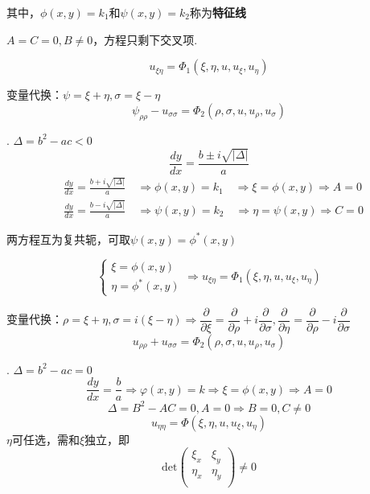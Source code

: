 其中，$\phi(x,y)=k_{1}$和$\psi(x,y)=k_{2}$称为\textbf{特征线}

$A=C=0,B\ne0$，方程只剩下交叉项.
\begin{dfn}[双曲型PDE的标准形式]
$$u_{\xi\eta}=\Phi_{1}(\xi,\eta,u,u_{\xi},u_{\eta})$$

变量代换：$\psi=\xi+\eta,\sigma=\xi-\eta$
$$\psi_{\rho\rho}-u_{\sigma\sigma}=\Phi_{2}(\rho,\sigma,u,u_{\rho},u_{\sigma})$$
\end{dfn}


. $\Delta=b^2-ac<0$
$$\frac{dy}{dx}=\frac{b\pm i\sqrt{|\Delta|}}{a}$$
$$\begin{aligned}
    &\frac{dy}{dx}=\frac{b+i\sqrt{|\Delta|}}{a}\quad\Rightarrow\phi(x,y)=k_{1}\quad\Rightarrow\xi=\phi(x,y)\Rightarrow A=0\\
    &\frac{dy}{dx}=\frac{b-i\sqrt{|\Delta|}}{a}\quad\Rightarrow\psi(x,y)=k_{2}\quad\Rightarrow\eta=\psi(x,y)\Rightarrow C=0
\end{aligned}$$

两方程互为复共轭，可取$\psi(x,y)=\phi^*(x,y)$
\begin{dfn}[椭圆型PDE的标准形式]
$$\begin{cases}\xi=\phi(x,y)\\\eta=\phi^{*}(x,y)\end{cases}\Rightarrow u_{\xi\eta}=\Phi_1(\xi,\eta,u,u_{\xi},u_{\eta})$$

变量代换：$\rho=\xi+\eta,\sigma=i(\xi-\eta)\Rightarrow\dfrac{\partial}{\partial\xi}=\dfrac{\partial}{\partial\rho}+i\dfrac{\partial}{\partial\sigma},\dfrac{\partial}{\partial\eta}=\dfrac{\partial}{\partial\rho}-i\dfrac{\partial}{\partial\sigma}$
$$u_{\rho\rho}+u_{\sigma\sigma}=\Phi_{2}(\rho,\sigma,u,u_{\rho},u_{\sigma})$$



\end{dfn}

. $\Delta=b^2-ac=0$
$$\frac{dy}{dx}=\frac{b}{a}\Rightarrow\varphi(x,y)=k\Rightarrow\xi=\phi(x,y)\Rightarrow A=0$$
$$\Delta=B^{2}-AC=0, A=0\Rightarrow B=0,C\neq0$$
$$u_{\eta\eta}=\Phi(\xi,\eta,u,u_{\xi},u_{\eta})$$
$\eta$可任选，需和$\xi$独立，即
$$
\mathrm{det}\left(\begin{array}{cc}{{\xi_{x}}}&{{\xi_{y}}}\\{{\eta_{x}}}&{{\eta_{y}}}\\\end{array}\right)\ne0
$$


